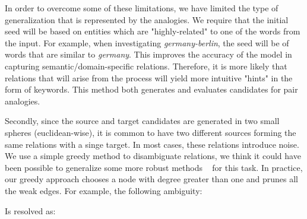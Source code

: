 \documentclass[11pt,a4paper]{article}
\begin{document}
In order to overcome some of these limitations, we have limited the type of generalization that is represented by the analogies. We require that the initial seed will be based on entities which are "highly-related" to one of the words from the input. For example, when investigating \textit{germany-berlin}, the seed will be of words that are similar to \textit{germany}. This improves the accuracy of the model in capturing semantic/domain-specific relations. Therefore, it is more likely that relations that will arise from the process will yield more intuitive "hints" in the form of keywords. This method both generates and evaluates candidates for pair analogies.

Secondly, since the source and target candidates are generated in two small spheres (euclidean-wise), it is common to have two different sources forming the same relations with a singe target. In most cases, these relations introduce noise. We use a simple greedy method to disambiguate relations, we think it could have been possible to generalize some more robust methods ~\cite{daelemans1999introduction} for this task. In practice, our greedy approach chooses a node with degree greater than one and prunes all the weak edges. For example, the following ambiguity:


Is resolved as:

\end{document}
